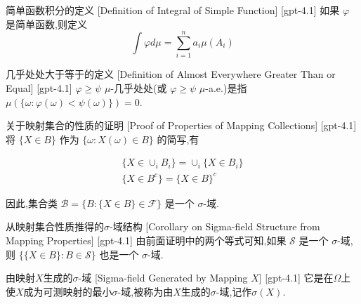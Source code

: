 \documentclass[UTF8]{ctexart}
\begin{document}
    
    
    \begin{dfn}
        {简单函数积分的定义}
        [Definition of Integral of Simple Function]
        [gpt-4.1]
        如果 $\varphi$ 是简单函数,则定义
\[
\int \varphi d\mu = \sum_{i=1}^n a_i \mu(A_i)
\]

    \end{dfn}
    
    
    
    \begin{dfn}
        {几乎处处大于等于的定义}
        [Definition of Almost Everywhere Greater Than or Equal]
        [gpt-4.1]
        $\varphi \geq \psi$ $\mu$-几乎处处(或 $\varphi \geq \psi$ $\mu$-a.e.)是指 $\mu(\{ \omega : \varphi(\omega) < \psi(\omega) \}) = 0$.
    \end{dfn}
    
    
    
    \begin{prf}
        {关于映射集合的性质的证明}
        [Proof of Properties of Mapping Collections]
        [gpt-4.1]
        将 $\{ X \in B \}$ 作为 $\{ \omega : X(\omega) \in B \}$ 的简写,有

\[
\begin{array}{c}
  \{ X \in \cup_{i} B_{i} \} = \cup_{i} \{ X \in B_{i} \} \\
  \{ X \in B^{c} \} = \{ X \in B \}^{c}
\end{array}
\]

因此,集合类 $\mathcal{B} = \{ B : \{ X \in B \} \in \mathcal{F} \}$ 是一个 $\sigma$-域.
    \end{prf}
    
    
    
    \begin{crl}
        {从映射集合性质推得的$\sigma$-域结构}
        [Corollary on Sigma-field Structure from Mapping Properties]
        [gpt-4.1]
        由前面证明中的两个等式可知,如果 $\mathcal{S}$ 是一个 $\sigma$-域,则 $\{ \{ X \in B \} : B \in \mathcal{S} \}$ 也是一个 $\sigma$-域.
    \end{crl}
    
    
    
    \begin{dfn}
        {由映射$X$生成的$\sigma$-域}
        [Sigma-field Generated by Mapping $X$]
        [gpt-4.1]
        它是在$\Omega$上使$X$成为可测映射的最小$\sigma$-域,被称为由$X$生成的$\sigma$-域,记作$\sigma(X)$.
    \end{dfn}
    
\end{document}
